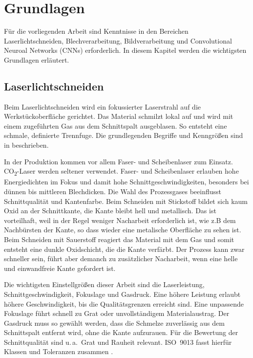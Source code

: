 \chapter{Grundlagen}

Für die vorliegenden Arbeit sind Kenntnisse in den Bereichen Laserlichtschneiden, Blechverarbeitung, Bildverarbeitung und Convolutional Neuroal Networks (CNNs) erforderlich. In diesem Kapitel werden die wichtigsten Grundlagen erläutert.

\section{Laserlichtschneiden}
\label{sec:laserlichtschneiden}

Beim Laserlichtschneiden wird ein fokussierter Laserstrahl auf die Werkstückoberfläche gerichtet. Das Material schmilzt lokal auf und wird mit einem zugeführten Gas aus dem Schnittspalt ausgeblasen. So entsteht eine schmale, definierte Trennfuge. Die grundlegenden Begriffe und Kenngrößen sind in \parencite{ISO11145-2018} beschrieben.

In der Produktion kommen vor allem Faser- und Scheibenlaser zum Einsatz. CO\textsubscript{2}-Laser werden seltener verwendet. Faser- und Scheibenlaser erlauben hohe Energiedichten im Fokus und damit hohe Schnittgeschwindigkeiten, besonders bei dünnen bis mittleren Blechdicken. Die Wahl des Prozessgases beeinflusst Schnittqualität und Kantenfarbe. Beim Schneiden mit Stickstoff bildet sich kaum Oxid an der Schnittkante, die Kante bleibt hell und metallisch. Das ist vorteilhaft, weil in der Regel weniger Nacharbeit erforderlich ist, wie z.B dem Nachbürsten der Kante, so dass wieder eine metalische Oberfläche zu sehen ist. Beim Schneiden mit Sauerstoff reagiert das Material mit dem Gas und somit entsteht eine dunkle Oxidschicht, die die Kante verfärbt. Der Prozess kann zwar schneller sein, führt aber demanch zu zusätzlicher Nacharbeit, wenn eine helle und einwandfreie Kante gefordert ist.

Die wichtigsten Einstellgrößen dieser Arbeit sind die Laserleistung, Schnittgeschwindigkeit, Fokuslage und Gasdruck. Eine höhere Leistung erlaubt höhere Geschwindigkeit, bis die Qualitätsgrenzen erreicht sind. Eine unpassende Fokuslage führt schnell zu Grat oder unvollständigem Materialaustrag. Der Gasdruck muss so gewählt werden, dass die Schmelze zuverlässig aus dem Schnittspalt entfernt wird, ohne die Kante aufzurauen. Für die Bewertung der Schnittqualität sind u.\,a.\ Grat und Rauheit relevant. ISO~9013 fasst hierfür Klassen und Toleranzen zusammen \parencite{ISO9013-2017}.

